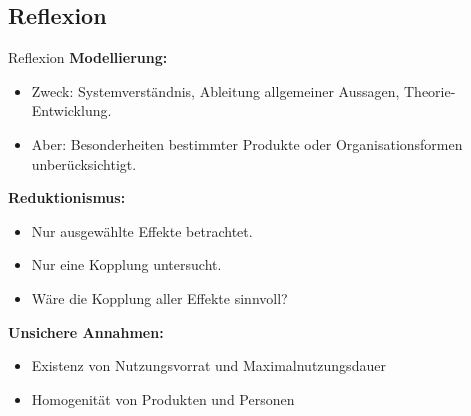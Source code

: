 \documentclass[beamer, xcolor={table,usenames,dvipsnames}]{beamer}
\begin{document}
    \subsection{Reflexion}
	\begin{frame}{Reflexion}
			\pause
			\textbf{Modellierung:}
			\begin{itemize}
				\item Zweck: Systemverständnis, Ableitung allgemeiner Aussagen, Theorie-Entwicklung.
				\item Aber: Besonderheiten bestimmter Produkte oder Organisationsformen unberücksichtigt. 	
			\end{itemize}
			\pause
			\textbf{Reduktionismus:}
			\begin{itemize}
			\item Nur ausgewählte Effekte betrachtet.
			\item Nur eine Kopplung untersucht.
			\item Wäre die Kopplung aller Effekte sinnvoll?	
			\end{itemize}
			\pause
			\textbf{Unsichere Annahmen:}
			\begin{itemize}
				\item Existenz von Nutzungsvorrat und Maximalnutzungsdauer
				\item Homogenität von Produkten und Personen
			\end{itemize}

	\end{frame}
\end{document}
